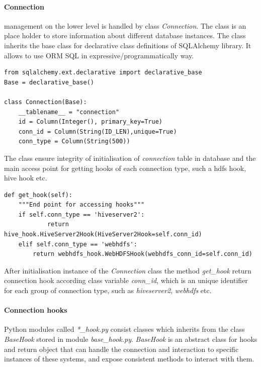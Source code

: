 \documentclass[a4paper,12pt,oneside]{report}
\begin{document}
\paragraph{Connection} management on the  lower level is handled by  class \textit{Connection}. The class is an place holder to store information about different database instances. The class inherits the  base class for declarative class definitions of SQLAlchemy library. 
It allows to use ORM SQL in expressive/programmatically way.  
\begin{footnotesize}
\begin{lstlisting}[style=python]
from sqlalchemy.ext.declarative import declarative_base
Base = declarative_base()

class Connection(Base):
    __tablename__ = "connection"
    id = Column(Integer(), primary_key=True)
    conn_id = Column(String(ID_LEN),unique=True)
    conn_type = Column(String(500))
\end{lstlisting}
\end{footnotesize}
The class ensure integrity of initialisation of \textit{connection} table in database and the main access point for getting hooks of each connection type, such a hdfs hook, hive hook etc. 
\begin{footnotesize}
\begin{lstlisting}[style=python]
def get_hook(self):
	"""End point for accessing hooks"""
    if self.conn_type == 'hiveserver2':
    		return hive_hook.HiveServer2Hook(HiveServer2Hook=self.conn_id)
    elif self.conn_type == 'webhdfs':
        return webhdfs_hook.WebHDFSHook(webhdfs_conn_id=self.conn_id)
\end{lstlisting}
\end{footnotesize}
After initialisation instance of the \textit{Connection} class the method \textit{get\_hook} return connection hook according class variable \textit{conn\_id}, which is an unique identifier for each group of connection type, such as \textit{hiveserver2}, \textit{webhdfs} etc.

\paragraph{Connection hooks}
Python modules called \textit{*\_hook.py} consist classes which inherits from the class \textit{BaseHook} stored in module \textit{base\_hook.py}.
\textit{BaseHook} is an abstract class for hooks and return object that can handle the connection and interaction to specific instances of these systems, and expose consistent methods to interact with them.
\end{document}
